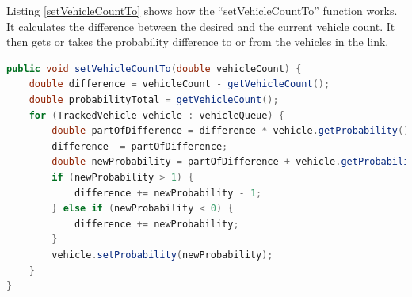 Listing \ref{setVehicleCountTo} shows how the ``setVehicleCountTo'' function works. It calculates the difference between the desired and the current vehicle count. It then gets or takes the probability difference to or from the vehicles in the link.

\newpage

\begin{lstlisting}[caption={Set Vehicle Count Function of TrackedLink}, label=setVehicleCountTo, language=Java]
public void setVehicleCountTo(double vehicleCount) {
	double difference = vehicleCount - getVehicleCount();
	double probabilityTotal = getVehicleCount();
	for (TrackedVehicle vehicle : vehicleQueue) {
		double partOfDifference = difference * vehicle.getProbability() / probabilityTotal;
		difference -= partOfDifference;
		double newProbability = partOfDifference + vehicle.getProbability();
		if (newProbability > 1) {
			difference += newProbability - 1;
		} else if (newProbability < 0) {
			difference += newProbability;
		}
		vehicle.setProbability(newProbability);
	}
}
\end{lstlisting}